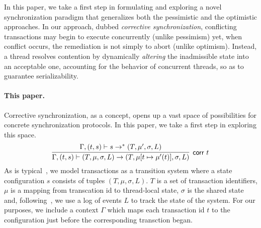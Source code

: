 %
In this paper, we take a first step in formulating and exploring a novel synchronization paradigm that generalizes both the pessimistic and the optimistic approaches.
%
In our approach, dubbed \emph{corrective synchronization}, conflicting transactions may begin to execute concurrently (unlike pessimism) yet, when conflict occurs, the remediation is not simply to abort (unlike optimism). Instead, a thread resolves contention by dynamically \emph{altering} the inadmissible state into an acceptable one, accounting for the behavior of concurrent threads, so as to guarantee serializability.





\paragraph{This paper.} Corrective synchronization, as a concept, opens up a vast space of possibilities for concrete synchronization protocols. In this paper, we take a first step in exploring this space.
%
$$
\infer[\text{{\sf corr }} t]{\Gamma, (t,s) \vdash (T, \mu, \sigma, L) \rightarrow (T,\mu[t \mapsto \mu'(t)], \sigma, L)}{
   \Gamma, (t,s) \vdash
	s \rightarrow^{*} (T,\mu', \sigma, L)}
$$
As is typical~\cite{Koskinen15,others}, we model transactions as a transition system
where a state configuration $s$ consists of tuples $(T,\mu,\sigma,L)$.
$T$ is a set of transaction identifiers,  $\mu$ is a mapping from
transcation id to thread-local state, $\sigma$ is the shared state
and, following~\cite{Koskinen15}, we use a log of events $L$ to track the
state of the system.
%
For our purposes, we include a context $\Gamma$ which maps each transaction
id $t$ to the configuration just before the corresponding transction began.

